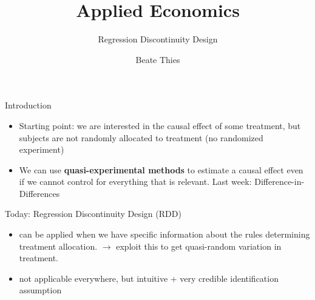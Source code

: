 \documentclass[11pt, aspectratio = 169]{beamer}
\title{Applied Economics}
\subtitle{Regression Discontinuity Design}
\author{Beate Thies}
\date{}
\institute{Winter 2024/25}
\begin{document}

	
	\maketitle
	

\begin{frame}{Introduction}
	
		\begin{itemize}
			\item Starting point: we are interested in the causal effect of some treatment, but subjects are not randomly allocated to treatment (no randomized experiment)
			
			\item We can use \textbf{\alert{quasi-experimental methods}} to estimate a causal effect even if we cannot control for everything that is relevant. Last week: Difference-in-Differences  %
		\end{itemize}
		\begin{block}{Today: Regression Discontinuity Design (RDD)}
			\begin{itemize}
				\item can be applied when we have specific information about the rules determining treatment allocation. $\rightarrow$ exploit this to get quasi-random variation in treatment.
				
				\item not applicable everywhere, but intuitive + very credible identification assumption
			\end{itemize}
		\end{block}
	\end{frame}	
	
\end{document}
